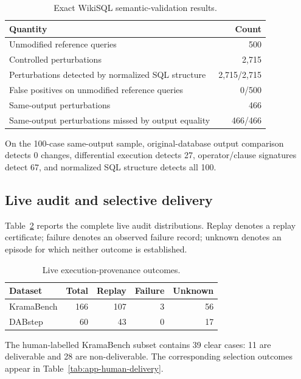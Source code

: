 \begin{table}[t]
\centering
\caption{Exact WikiSQL semantic-validation results.}
\label{tab:app-semantic-results}
\scriptsize
\setlength{\tabcolsep}{3pt}
\renewcommand{\arraystretch}{1.06}
\begin{tabularx}{\columnwidth}{@{}Xr@{}}
\toprule
Quantity & Count \\
\midrule
Unmodified reference queries
& 500 \\
Controlled perturbations
& 2,715 \\
Perturbations detected by normalized SQL structure
& 2,715/2,715 \\
False positives on unmodified reference queries
& 0/500 \\
Same-output perturbations
& 466 \\
Same-output perturbations missed by output equality
& 466/466 \\
\bottomrule
\end{tabularx}
\end{table}

On the 100-case same-output sample, original-database output
comparison detects 0 changes, differential execution detects 27,
operator/clause signatures detect 67, and normalized SQL structure
detects all 100.

\subsection{Live audit and selective delivery}

Table~\ref{tab:app-live-distribution} reports the complete live
audit distributions. Replay denotes a replay certificate; failure
denotes an observed failure record; unknown denotes an episode for
which neither outcome is established.

\begin{table}[t]
\centering
\caption{Live execution-provenance outcomes.}
\label{tab:app-live-distribution}
\scriptsize
\setlength{\tabcolsep}{4pt}
\begin{tabular}{@{}lrrrr@{}}
\toprule
Dataset & Total & Replay & Failure & Unknown \\
\midrule
KramaBench & 166 & 107 & 3 & 56 \\
DABstep & 60 & 43 & 0 & 17 \\
\bottomrule
\end{tabular}
\end{table}

The human-labelled KramaBench subset contains 39 clear cases: 11
are deliverable and 28 are non-deliverable. The corresponding selection
outcomes appear in Table~\ref{tab:app-human-delivery}.

